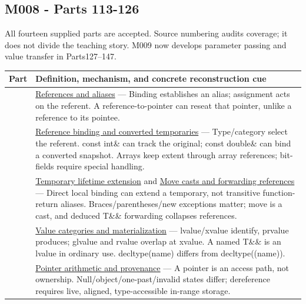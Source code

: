 \subsection{M008 - Parts 113-126}\label{appendix-fd090d982a15-m008---parts-113-126}

All fourteen supplied parts are accepted. Source numbering audits coverage; it does not divide the teaching story. M009 now develops parameter passing and value transfer in Parts127--147.

{\def\LTcaptype{none} %
\begin{longtable}[]{@{}
  >{\raggedright\arraybackslash}p{}
  >{\raggedright\arraybackslash}p{}@{}}
\toprule\noalign{}
\begin{minipage}[b]{\linewidth}\raggedright
Part
\end{minipage} & \begin{minipage}[b]{\linewidth}\raggedright
Definition, mechanism, and concrete reconstruction cue
\end{minipage} \\
\midrule\noalign{}
\endhead
\bottomrule\noalign{}
\endlastfoot
113 & \hyperref[appendix-d6d562ca9fbb]{References and aliases} --- Binding establishes an alias; assignment acts on the referent. A reference-to-pointer can reseat that pointer, unlike a reference to its pointee. \\
114 & \hyperref[appendix-37856d997bb0]{Reference binding and converted temporaries} --- Type/category select the referent. const int\& can track the original; const double\& can bind a converted snapshot. Arrays keep extent through array references; bit-fields require special handling. \\
115 & \hyperref[appendix-a978b29bbbb0]{Temporary lifetime extension} and \hyperref[appendix-0104b704fb11]{Move casts and forwarding references} --- Direct local binding can extend a temporary, not transitive function-return aliases. Braces/parentheses/new exceptions matter; move is a cast, and deduced T\&\& forwarding collapses references. \\
116 & \hyperref[appendix-1121b30eaeb0]{Value categories and materialization} --- lvalue/xvalue identify, prvalue produces; glvalue and rvalue overlap at xvalue. A named T\&\& is an lvalue in ordinary use. decltype(name) differs from decltype((name)). \\
117 & \hyperref[appendix-6af5921bc853]{Pointer arithmetic and provenance} --- A pointer is an access path, not ownership. Null/object/one-past/invalid states differ; dereference requires live, aligned, type-accessible in-range storage. \\

\end{longtable}}
